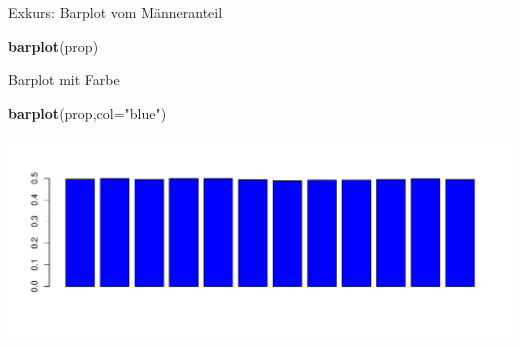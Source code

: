 \documentclass[ignorenonframetext,]{beamer}
\newenvironment{Shaded}{\begin{snugshade}}{\end{snugshade}}
\newcommand{\KeywordTok}[1]{\textcolor[rgb]{0.13,0.29,0.53}{\textbf{#1}}}
\newcommand{\DataTypeTok}[1]{\textcolor[rgb]{0.13,0.29,0.53}{#1}}
\newcommand{\StringTok}[1]{\textcolor[rgb]{0.31,0.60,0.02}{#1}}
\newcommand{\NormalTok}[1]{#1}
\begin{document}
\begin{frame}[fragile]{Exkurs: Barplot vom Männeranteil}

\begin{Shaded}
\begin{Highlighting}[]
\KeywordTok{barplot}\NormalTok{(prop)}
\end{Highlighting}
\end{Shaded}

\begin{block}{Barplot mit Farbe}

\begin{Shaded}
\begin{Highlighting}[]
\KeywordTok{barplot}\NormalTok{(prop,}\DataTypeTok{col=}\StringTok{"blue"}\NormalTok{)}
\end{Highlighting}
\end{Shaded}

\includegraphics{slides_all2gether_part1_files/figure-beamer/unnamed-chunk-73-1.pdf}

\end{block}

\end{frame}
\end{document}
